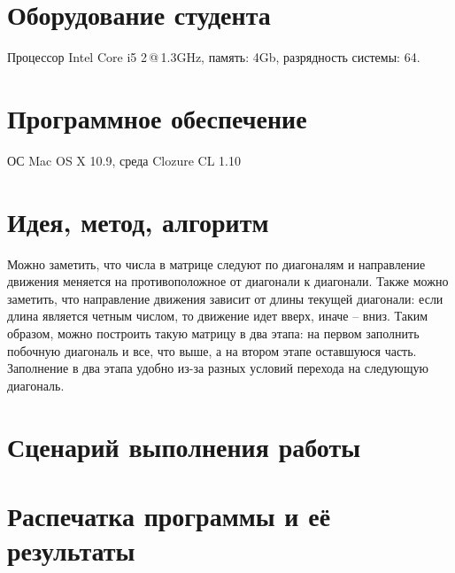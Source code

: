 \documentclass[a4paper, 12pt]{article}
\begin{document}
\section{Оборудование студента}
Процессор Intel Core i5 2\,@\,1.3GHz, память: 4Gb, разрядность системы: 64.


\section{Программное обеспечение}
ОС Mac OS X 10.9, среда Clozure CL 1.10


\section{Идея, метод, алгоритм}
Можно заметить, что числа в матрице следуют по диагоналям и направление движения меняется на противоположное от диагонали к диагонали. Также можно заметить, что направление движения зависит от длины текущей диагонали: если длина является четным числом, то движение идет вверх, иначе -- вниз. Таким образом, можно построить такую матрицу в два этапа: на первом заполнить побочную диагональ и все, что выше, а на втором этапе оставшуюся часть. Заполнение в два этапа удобно из-за разных условий перехода на следующую диагональ.


\section{Сценарий выполнения работы}


\section{Распечатка программы и её результаты}
\end{document}
